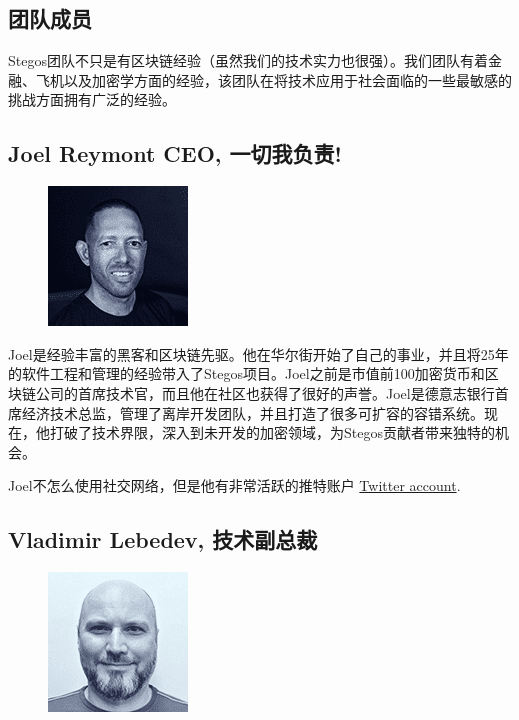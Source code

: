 \documentclass[8pt,fleqn,openany]{book}
\begin{document}
\begin{CJK*}{UTF8}{gbsn}
\chapter{团队成员}\label{app:team}

Stegos团队不只是有区块链经验（虽然我们的技术实力也很强）。我们团队有着金融、飞机以及加密学方面的经验，该团队在将技术应用于社会面临的一些最敏感的挑战方面拥有广泛的经验。

\section{Joel Reymont CEO, 一切我负责!}

{
\setlength\intextsep{0pt}
\begin{figure}
	\includegraphics{images/team/team-1.png}
\end{figure}

Joel是经验丰富的黑客和区块链先驱。他在华尔街开始了自己的事业，并且将25年的软件工程和管理的经验带入了Stegos项目。Joel之前是市值前100加密货币和区块链公司的首席技术官，而且他在社区也获得了很好的声誉。Joel是德意志银行首席经济技术总监，管理了离岸开发团队，并且打造了很多可扩容的容错系统。现在，他打破了技术界限，深入到未开发的加密领域，为Stegos贡献者带来独特的机会。

Joel不怎么使用社交网络，但是他有非常活跃的推特账户 \href{http://twitter.com/joelreymont}{Twitter account}.
}

\section{Vladimir Lebedev, 技术副总裁}

{
\setlength\intextsep{0pt}
\begin{figure}
	\includegraphics{images/team/team-2.png}
\end{figure}

}
\end{CJK*}
\end{document}
